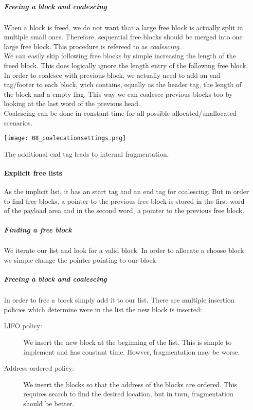 \subparagraph{Freeing a block and coalescing}
When a block is freed, we do not want that a large free block is actually split in multiple small ones. Therefore, sequential free blocks should be merged into one large free block. This procedure is refereed to as \textit{coalescing}.\\
We can easily skip following free blocks by simple increasing the length of the freed block. This does logically ignore the length entry of the following free block.\\
In order to coalesce with previous block, we actually need to add an end tag/footer to each block, wich contains, equally as the header tag, the length of the block and a empty flag. This way we can coalesce previous blocks too by looking at the last word of the previous head.\\
Coalescing can be done in constant time for all possible allocated/unallocated scenarios.

\texttt{[image: 08\_coalecationsettings.png]}

The additional end tag leads to internal fragmentation. 

\paragraph{Explicit free lists}
As the implicit list, it has an start tag and an end tag for coalescing. But in order to find free blocks, a pointer to the previous free block is stored in the first word of the payload area and in the second word, a pointer to the previous free block.

\subparagraph{Finding a free block}
We iterate our list and look for a valid block. In order to allocate a choose block we simple change the pointer pointing to our block.

\subparagraph{Freeing a block and coalescing}
In order to free a block simply add it to our list. There are multiple insertion policies which determine were in the list the new block is inserted:

\begin{description}
    \item[LIFO policy:] We insert the new block at the beginning of the list. This is simple to implement and has constant time. Howver, fragmentation may be worse.
    \item[Address-ordered policy:] We insert the blocks so that the address of the blocks are ordered. This requires search to find the desired location, but in turn, fragmentation should be better.
\end{description}

